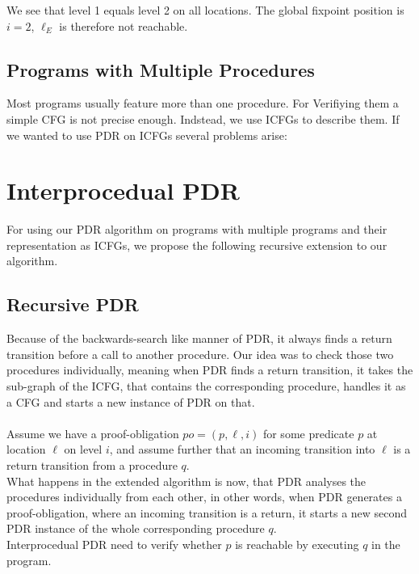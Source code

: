 \documentclass{article}
\newcommand\mycom[1]{}
\newcommand\mycom[1]{#1}
\newcommand{\jw}[1]{\mycom{\todo[color=blue!40,inline]{\small JW: #1}}}
\begin{document}
	\hspace*{5cm}
	
	We see that level 1 equals level 2 on all locations. The global fixpoint position is $i = 2$, $\ell_E$ is therefore not reachable.
	
	\subsection{Programs with Multiple Procedures}
	Most programs usually feature more than one procedure. For Verifiying them a simple CFG is not precise enough. Indstead, we use ICFGs to describe them. If we wanted to use PDR on ICFGs several problems arise:
	\jw{Explain why normal PDR does not work on procedures.}
	
	\section{Interprocedual PDR}
	\jw{Rewrite this for changed global frames: Global frames are now only a map of locations to disjunction of predicates}
	For using our PDR algorithm on programs with multiple programs and their representation as ICFGs, we propose the following recursive extension to our algorithm.
	\subsection{Recursive PDR}
	Because of the backwards-search like manner of PDR, it always finds a return transition before a call to another procedure. Our idea was to check those two procedures individually, meaning when PDR finds a return transition, it takes the sub-graph of the ICFG, that contains the corresponding procedure, handles it as a CFG and starts a new instance of PDR on that. \\ \\
	Assume we have a proof-obligation $po = (p, \ell, i)$ for some predicate $p$ at location $\ell$ on level $i$, and assume further that an incoming transition into $\ell$ is a return transition from a procedure $q$. \\
	What happens in the extended algorithm is now, that PDR analyses the procedures individually from each other, in other words, when PDR generates a proof-obligation, where an incoming transition is a return, it starts a new second PDR instance of the whole corresponding procedure $q$. \\
	Interprocedual PDR need to verify whether $p$ is reachable by executing $q$ in the program. \\
	
\end{document}
